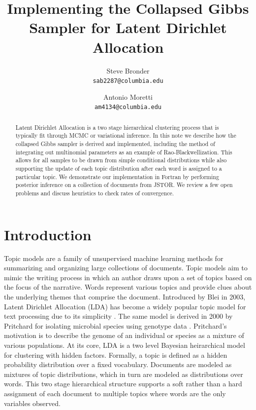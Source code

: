 \documentclass{article}%
\title{Implementing the Collapsed Gibbs Sampler for Latent Dirichlet Allocation}
\author{
  Steve Bronder \\
  \texttt{sab2287@columbia.edu} \\
   \and
   Antonio Moretti \\
   \texttt{am4134@columbia.edu} \\
}
\theoremstyle{definition}
\begin{document}

\maketitle

\begin{abstract}
  Latent Dirichlet Allocation is a two stage hierarchical clustering process that is typically fit through MCMC or variational inference. In this note we describe how the collapsed Gibbs sampler is derived and implemented, including the method of integrating out multinomial parameters as an example of Rao-Blackwellization. This allows for all samples to be drawn from simple conditional distributions while also supporting the update of each topic distribution after each word is assigned to a particular topic. We demonstrate our implementation in Fortran by performing posterior inference on a collection of documents from JSTOR. We review a few open problems and discuss heuristics to check rates of convergence.  %
  \end{abstract}

\section{Introduction}
Topic models are a family of unsupervised machine learning methods for summarizing and organizing large collections of documents. Topic models aim to mimic the writing process in which an author draws upon a set of topics based on the focus of the narrative. Words represent various topics and provide clues about the underlying themes that comprise the document. Introduced by Blei in 2003,  Latent Dirichlet Allocation (LDA) has become a widely popular topic model for text processing due to its simplicity \cite{Blei:2003:LDA:944919.944937}. The same model is derived in 2000 by Pritchard for isolating microbial species using genotype data \cite{Pritchardetal2000}. Pritchard's motivation is to describe the genome of an individual or species as a mixture of various populations. At its core, LDA is a two level Bayesian heirarchical model for clustering with hidden factors. Formally, a topic is defined as a hidden probability distribution over a fixed vocabulary. Documents are modeled as mixtures of topic distributions, which in turn are modeled as distributions over words. This two stage hierarchical structure supports a soft rather than a hard assignment of each document to multiple topics where words are the only variables observed. \nocite{10.2307/2685208,citeulike:6744178} 
\end{document}
